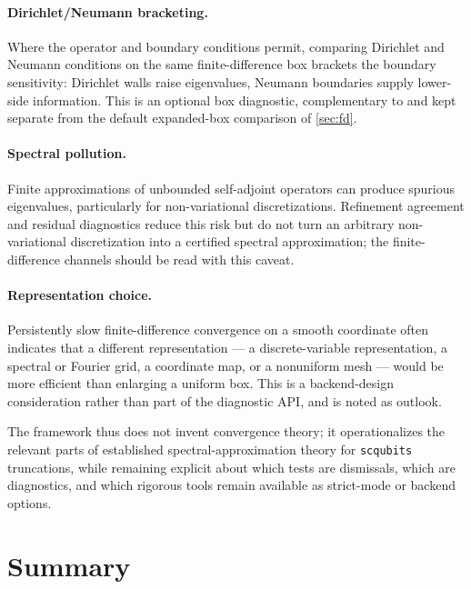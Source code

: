 \documentclass[11pt,a4paper]{article}
\begin{document}
\paragraph{Dirichlet/Neumann bracketing.}
Where the operator and boundary conditions permit, comparing Dirichlet and Neumann conditions on the same finite-difference box brackets the boundary sensitivity: Dirichlet walls raise eigenvalues, Neumann boundaries supply lower-side information.  This is an optional box diagnostic, complementary to and kept separate from the default expanded-box comparison of \cref{sec:fd}.

\paragraph{Spectral pollution.}
Finite approximations of unbounded self-adjoint operators can produce spurious eigenvalues, particularly for non-variational discretizations.  Refinement agreement and residual diagnostics reduce this risk but do not turn an arbitrary non-variational discretization into a certified spectral approximation; the finite-difference channels should be read with this caveat.

\paragraph{Representation choice.}
Persistently slow finite-difference convergence on a smooth coordinate often indicates that a different representation --- a discrete-variable representation, a spectral or Fourier grid, a coordinate map, or a nonuniform mesh --- would be more efficient than enlarging a uniform box.  This is a backend-design consideration rather than part of the diagnostic API, and is noted as outlook.

The framework thus does not invent convergence theory; it operationalizes the relevant parts of established spectral-approximation theory for \texttt{scqubits} truncations, while remaining explicit about which tests are dismissals, which are diagnostics, and which rigorous tools remain available as strict-mode or backend options.

\section{Summary}
\end{document}
